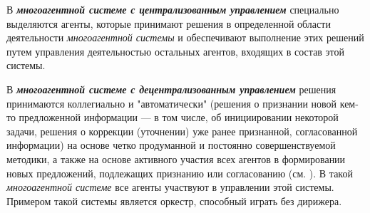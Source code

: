 В \textbf{\textit{многоагентной системе с централизованным управлением}} специально выделяются агенты, которые принимают решения в определенной области деятельности \textit{многоагентной системы} и обеспечивают выполнение этих решений путем управления деятельностью остальных агентов, входящих в состав этой системы.

В \textbf{\textit{многоагентной системе с децентрализованным управлением}} решения принимаются коллегиально и "автоматически"{} (решения о признании новой кем-то предложенной информации --- в том числе, об инициировании некоторой задачи, решения о коррекции (уточнении) уже ранее признанной, согласованной информации) на основе четко продуманной и постоянно совершенствуемой методики, а также на основе активного участия всех агентов в формировании новых предложений, подлежащих признанию или согласованию (см. ). 
В такой \textit{многоагентной системе} все агенты участвуют в управлении этой системы. 
Примером такой системы является оркестр, способный играть без дирижера.


